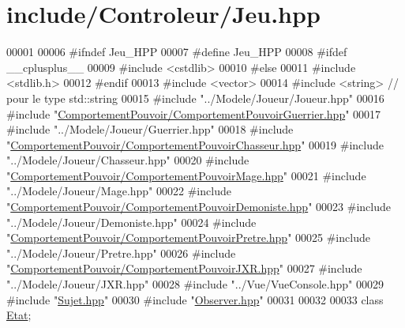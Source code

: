 \hypertarget{_jeu_8hpp_source}{\section{include/\-Controleur/\-Jeu.hpp}
}

\begin{DoxyCode}
00001 
00006 \textcolor{preprocessor}{#ifndef Jeu\_HPP}
00007 \textcolor{preprocessor}{}\textcolor{preprocessor}{#define Jeu\_HPP}
00008 \textcolor{preprocessor}{}\textcolor{preprocessor}{#ifdef \_\_cplusplus\_\_}
00009 \textcolor{preprocessor}{}\textcolor{preprocessor}{#include <cstdlib>}
00010 \textcolor{preprocessor}{#else}
00011 \textcolor{preprocessor}{}\textcolor{preprocessor}{#include <stdlib.h>}
00012 \textcolor{preprocessor}{#endif}
00013 \textcolor{preprocessor}{}\textcolor{preprocessor}{#include <vector>}
00014 \textcolor{preprocessor}{#include <string>} \textcolor{comment}{// pour le type std::string}
00015 \textcolor{preprocessor}{#include "../Modele/Joueur/Joueur.hpp"}
00016 \textcolor{preprocessor}{#include "\hyperlink{_comportement_pouvoir_guerrier_8hpp}{ComportementPouvoir/ComportementPouvoirGuerrier.hpp}"}
00017 \textcolor{preprocessor}{#include "../Modele/Joueur/Guerrier.hpp"}
00018 \textcolor{preprocessor}{#include "\hyperlink{_comportement_pouvoir_chasseur_8hpp}{ComportementPouvoir/ComportementPouvoirChasseur.hpp}"}
00019 \textcolor{preprocessor}{#include "../Modele/Joueur/Chasseur.hpp"}
00020 \textcolor{preprocessor}{#include "\hyperlink{_comportement_pouvoir_mage_8hpp}{ComportementPouvoir/ComportementPouvoirMage.hpp}"}
00021 \textcolor{preprocessor}{#include "../Modele/Joueur/Mage.hpp"}
00022 \textcolor{preprocessor}{#include "\hyperlink{_comportement_pouvoir_demoniste_8hpp}{ComportementPouvoir/ComportementPouvoirDemoniste.hpp}"}
00023 \textcolor{preprocessor}{#include "../Modele/Joueur/Demoniste.hpp"}
00024 \textcolor{preprocessor}{#include "\hyperlink{_comportement_pouvoir_pretre_8hpp}{ComportementPouvoir/ComportementPouvoirPretre.hpp}"}
00025 \textcolor{preprocessor}{#include "../Modele/Joueur/Pretre.hpp"}
00026 \textcolor{preprocessor}{#include "\hyperlink{_comportement_pouvoir_j_x_r_8hpp}{ComportementPouvoir/ComportementPouvoirJXR.hpp}"}
00027 \textcolor{preprocessor}{#include "../Modele/Joueur/JXR.hpp"}
00028 \textcolor{preprocessor}{#include "../Vue/VueConsole.hpp"}
00029 \textcolor{preprocessor}{#include "\hyperlink{_sujet_8hpp}{Sujet.hpp}"}
00030 \textcolor{preprocessor}{#include "\hyperlink{_observer_8hpp}{Observer.hpp}"}
00031 
00032 
00033 \textcolor{keyword}{class }\hyperlink{class_etat}{Etat};

\end{DoxyCode}
